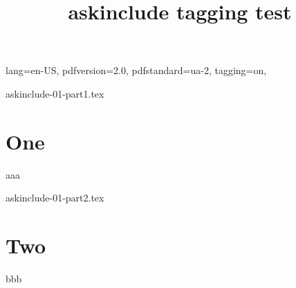 \DocumentMetadata
  {
    lang=en-US,
    pdfversion=2.0,
    pdfstandard=ua-2,
    tagging=on,
  }
\begin{filecontents}[overwrite]{askinclude-01-part1.tex}
\chapter{One}
aaa
\end{filecontents}
\begin{filecontents}[overwrite]{askinclude-01-part2.tex}
\chapter{Two}
bbb
\end{filecontents}
\def\typein[#1]#2{\typeout{#2}\def#1{*}}
\documentclass{report}
\usepackage{askinclude}

\title{askinclude tagging test}



Some intro text



